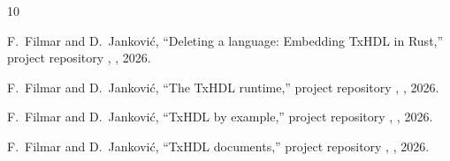 \documentclass[journal,9pt]{IEEEtran}
\begin{document}
\begin{thebibliography}{10}

F.~Filmar and D.~Janković, ``Deleting a language: Embedding TxHDL in
Rust,'' project repository , ,
2026.

F.~Filmar and D.~Janković, ``The TxHDL runtime,'' project repository
, , 2026.

F.~Filmar and D.~Janković, ``TxHDL by example,'' project repository
, , 2026.

F.~Filmar and D.~Janković, ``TxHDL documents,'' project repository
, , 2026.

\end{thebibliography}
\end{document}
